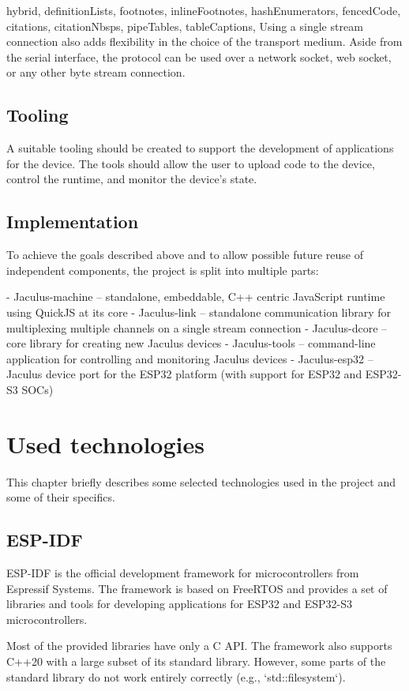 \begin{markdown*}{%
  hybrid,
  definitionLists,
  footnotes,
  inlineFootnotes,
  hashEnumerators,
  fencedCode,
  citations,
  citationNbsps,
  pipeTables,
  tableCaptions,
}
Using a single stream connection also adds flexibility in the choice of the transport medium. Aside from the serial interface, the protocol can be used over a network socket, web socket, or any other byte stream connection.

\section{Tooling}

A suitable tooling should be created to support the development of applications for the device. The tools should allow the user to upload code to the device, control the runtime, and monitor the device's state.

\section{Implementation}

To achieve the goals described above and to allow possible future reuse of independent components, the project is split into multiple parts:

  - Jaculus-machine -- standalone, embeddable, C++ centric JavaScript runtime using QuickJS at its core
  - Jaculus-link -- standalone communication library for multiplexing multiple channels on a single stream connection
  - Jaculus-dcore -- core library for creating new Jaculus devices
  - Jaculus-tools -- command-line application for controlling and monitoring Jaculus devices
  - Jaculus-esp32 -- Jaculus device port for the ESP32 platform (with support for ESP32 and ESP32-S3 SOCs)


\chapter{Used technologies}

This chapter briefly describes some selected technologies used in the project and some of their specifics.

\section{ESP-IDF}

ESP-IDF is the official development framework for microcontrollers from Espressif Systems. The framework is based on FreeRTOS and provides a set of libraries and tools for developing applications for ESP32 and ESP32-S3 microcontrollers.

Most of the provided libraries have only a C API. The framework also supports C++20 with a large subset of its standard library. However, some parts of the standard library do not work entirely correctly (e.g., `std::filesystem`).


\end{markdown*}
